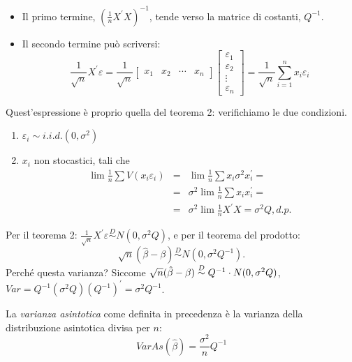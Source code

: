 \documentclass[a4paper]{report}
\newcounter{def}
\theoremstyle{remark}
\begin{document}
\begin{enumerate}
\begin{itemize}
\item Il primo termine, $(\frac{1}{n}X^{\prime }X)^{-1}$, tende verso la
matrice di costanti, $Q^{-1}$.

\item Il secondo termine pu\`{o} scriversi:%
\begin{equation*}
\frac{1}{\sqrt{n}}X^{\prime }\varepsilon =\frac{1}{\sqrt{n}}\left[ 
\begin{array}{cccc}
x_{1} & x_{2} & \cdots & x_{n}%
\end{array}%
\right] \left[ 
\begin{array}{c}
\varepsilon _{1} \\ 
\varepsilon _{2} \\ 
\vdots \\ 
\varepsilon _{n}%
\end{array}%
\right] =\frac{1}{\sqrt{n}}\sum\limits_{i=1}^{n}x_{i}\varepsilon _{i}
\end{equation*}
\end{itemize}

Quest'espressione \`{e} proprio quella del teorema 2: verifichiamo le due
condizioni.

\begin{enumerate}
\item $\varepsilon _{i}\sim i.i.d.(0,\sigma ^{2})$

\item $x_{i}$ non stocastici, tali che 
\begin{eqnarray*}
\lim \frac{1}{n}\sum V(x_{i}\varepsilon _{i}) &=&\lim \frac{1}{n}\sum
x_{i}\sigma ^{2}x_{i}^{\prime }= \\
&=&\sigma ^{2}\lim \frac{1}{n}\sum x_{i}x_{i}^{\prime }= \\
&=&\sigma ^{2}\lim \frac{1}{n}X^{\prime }X=\sigma ^{2}Q,d.p.
\end{eqnarray*}
\end{enumerate}

Per il teorema 2: $\frac{1}{\sqrt{n}}X^{\prime }\varepsilon \overset{D}{\sim 
}N(0,\sigma ^{2}Q)$, e per il teorema del prodotto: 
\begin{equation*}
\sqrt{n}(\hat{\beta}-\beta )\overset{D}{\sim }N(0,\sigma ^{2}Q^{-1}).
\end{equation*}%
Perch\'{e} questa varianza? Siccome $\sqrt{n}(\hat{\beta}-\beta )\overset{D}{%
\sim }Q^{-1}\cdot N(0,\sigma ^{2}Q)$, $Var=Q^{-1}(\sigma
^{2}Q)(Q^{-1})^{\prime }=\sigma ^{2}Q^{-1}$.

La \emph{varianza asintotica} come definita in precedenza \`{e} la varianza
della distribuzione asintotica divisa per $n$:%
\begin{equation*}
VarAs(\hat{\beta})=\frac{\sigma ^{2}}{n}Q^{-1}
\end{equation*}
\end{enumerate}
\end{document}

